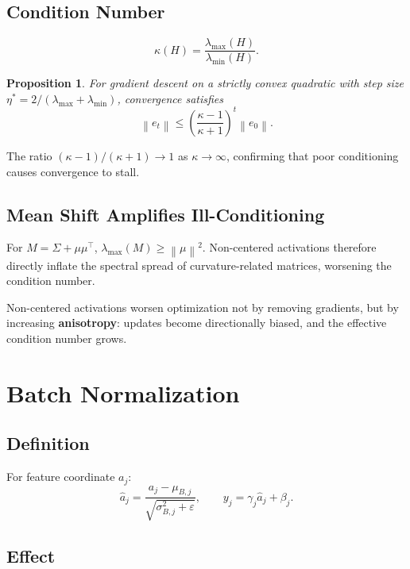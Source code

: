 \documentclass[12pt,a4paper]{article}
\newtheorem{proposition}{Proposition}[section]
\theoremstyle{definition}
\theoremstyle{remark}
\newcommand{\norm}[1]{\left\lVert #1 \right\rVert}
\begin{document}
\subsection{Condition Number}

\[
\kappa(H) = \frac{\lambda_{\max}(H)}{\lambda_{\min}(H)}.
\]

\begin{proposition}
For gradient descent on a strictly convex quadratic with step size $\eta^* = 2/(\lambda_{\max}+\lambda_{\min})$, convergence satisfies
\[
\norm{e_t} \le \left(\frac{\kappa-1}{\kappa+1}\right)^t \norm{e_0}.
\]
\end{proposition}

The ratio $(\kappa-1)/(\kappa+1) \to 1$ as $\kappa \to \infty$, confirming that poor conditioning causes convergence to stall.

\subsection{Mean Shift Amplifies Ill-Conditioning}

For $M = \Sigma + \mu\mu^\top$, $\lambda_{\max}(M) \ge \norm{\mu}^2$. Non-centered activations therefore directly inflate the spectral spread of curvature-related matrices, worsening the condition number.

\begin{keybox}
Non-centered activations worsen optimization not by removing gradients, but by increasing \textbf{anisotropy}: updates become directionally biased, and the effective condition number grows.
\end{keybox}

\section{Batch Normalization}

\subsection{Definition}

For feature coordinate $a_j$:
\[
\hat{a}_j = \frac{a_j - \mu_{B,j}}{\sqrt{\sigma_{B,j}^2 + \varepsilon}}, \qquad y_j = \gamma_j \hat{a}_j + \beta_j.
\]

\subsection{Effect}
\end{document}
